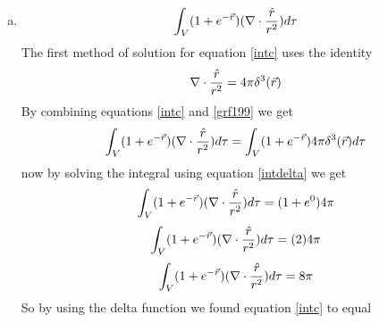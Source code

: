 \documentclass[11pt]{article}
\numberwithin{equation}{section}
\newcommand{\grad}{\bold\nabla}
\begin{document}
\begin{enumerate}[(a)]
\item
\begin{equation}
\int_V (1 + e^{-\vec{r}})(\grad \cdot \frac{\hat{r}}{r^2}) d\tau
\label{intc}
\end{equation}
The first method of solution for equation \ref{intc} uses the identity 
\begin{equation}
\grad \cdot \frac{\hat{r}}{r^2} = 4\pi\delta^3(\vec{r})
\label{grf199}
\end{equation}
By combining equations \ref{intc} and \ref{grf199} we get
$$\int_V (1 + e^{-\vec{r}})(\grad \cdot \frac{\hat{r}}{r^2}) d\tau = \int_V (1 + e^{-\vec{r}})4\pi\delta^3(\vec{r}) d\tau $$
now by solving the integral using equation \ref{intdelta} we get
$$\int_V (1 + e^{-\vec{r}})(\grad \cdot \frac{\hat{r}}{r^2}) d\tau = (1 + e^{0})4\pi $$
$$\int_V (1 + e^{-\vec{r}})(\grad \cdot \frac{\hat{r}}{r^2}) d\tau = (2)4\pi $$
$$\int_V (1 + e^{-\vec{r}})(\grad \cdot \frac{\hat{r}}{r^2}) d\tau = 8\pi $$
So by using the delta function we found equation \ref{intc} to equal 
\begin{center}
\fbox{$8\pi$}
\end{center}


\end{enumerate}
\end{document}
